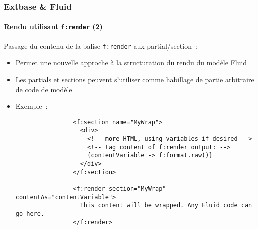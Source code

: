 
\begin{frame}[fragile]
	\frametitle{Extbase \& Fluid}
	\framesubtitle{Rendu utilisant \texttt{f:render} (2)}

	\lstset{basicstyle=\tiny\ttfamily}

	Passage du contenu de la balise \texttt{f:render} aux partial/section~:

	\begin{itemize}

		\item Permet une nouvelle approche à la structuration du rendu du modèle Fluid

		\item Les partials et sections peuvent s'utiliser comme habillage de
			partie arbitraire de code de modèle

		\item Exemple~:

			\begin{lstlisting}
				<f:section name="MyWrap">
				  <div>
				    <!-- more HTML, using variables if desired -->
				    <!-- tag content of f:render output: -->
				    {contentVariable -> f:format.raw()}
				  </div>
				</f:section>

				<f:render section="MyWrap" contentAs="contentVariable">
				  This content will be wrapped. Any Fluid code can go here.
				</f:render>
			\end{lstlisting}

	\end{itemize}

\end{frame}


